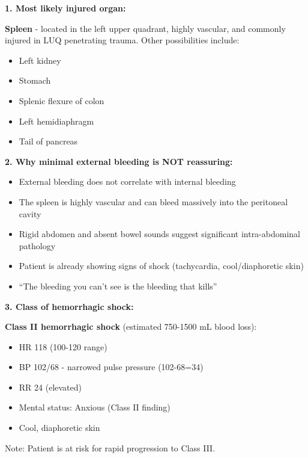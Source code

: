 \documentclass[11pt]{article}
\begin{document}
\vspace{3cm}

\begin{tcolorbox}[colback=green!5!white,colframe=green!75!black,title=Case Study 3 - Answers]

\textbf{1. Most likely injured organ:}

\textbf{Spleen} - located in the left upper quadrant, highly vascular, and commonly injured in LUQ penetrating trauma. Other possibilities include:
\begin{itemize}
    \item Left kidney
    \item Stomach
    \item Splenic flexure of colon
    \item Left hemidiaphragm
    \item Tail of pancreas
\end{itemize}

\textbf{2. Why minimal external bleeding is NOT reassuring:}

\begin{itemize}
    \item External bleeding does not correlate with internal bleeding
    \item The spleen is highly vascular and can bleed massively into the peritoneal cavity
    \item Rigid abdomen and absent bowel sounds suggest significant intra-abdominal pathology
    \item Patient is already showing signs of shock (tachycardia, cool/diaphoretic skin)
    \item ``The bleeding you can't see is the bleeding that kills''
\end{itemize}

\textbf{3. Class of hemorrhagic shock:}

\textbf{Class II hemorrhagic shock} (estimated 750-1500 mL blood loss):
\begin{itemize}
    \item HR 118 (100-120 range)
    \item BP 102/68 - narrowed pulse pressure (102-68=34)
    \item RR 24 (elevated)
    \item Mental status: Anxious (Class II finding)
    \item Cool, diaphoretic skin
\end{itemize}
Note: Patient is at risk for rapid progression to Class III.


\end{tcolorbox}
\end{document}

